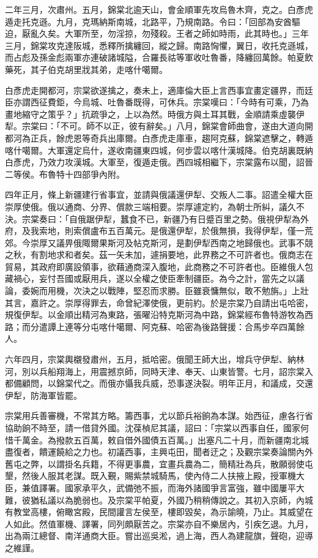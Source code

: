 \begin{pinyinscope}
二年三月，次肅州。五月，錦棠北逾天山，會金順軍先攻烏魯木齊，克之。白彥虎遁走托克遜。九月，克瑪納斯南城，北路平，乃規南路。令曰：「回部為安酋驅迫，厭亂久矣。大軍所至，勿淫掠，勿殘殺。王者之師如時雨，此其時也。」三年三月，錦棠攻克達阪城，悉釋所擒纏回，縱之歸。南路恟懼，翼日，收托克遜城，而占彪及孫金彪兩軍亦連破諸城隘，合羅長祜等軍收吐魯番，降纏回萬餘。帕夏飲藥死，其子伯克胡里戕其弟，走喀什噶爾。

白彥虎走開都河，宗棠欲遂擒之，奏未上，適庫倫大臣上言西事宜畫定疆界，而廷臣亦謂西征費鉅，今烏城、吐魯番既得，可休兵。宗棠嘆曰：「今時有可乘，乃為畫地縮守之策乎？」抗疏爭之，上以為然。時俄方與土耳其戰，金順請乘虛襲伊犁。宗棠曰：「不可。師不以正，彼有辭矣。」八月，錦棠會師曲會，遂由大道向開都河為正兵，餘虎恩等奇兵出庫爾。白彥虎走庫車，趨阿克蘇，錦棠遮擊之，轉遁喀什噶爾。大軍還定烏什，遂收南疆東四城，何步雲以喀什漢城降。伯克胡裏既納白彥虎，乃效力攻漢城。大軍至，復遁走俄。西四城相繼下，宗棠露布以聞，詔晉二等侯。布魯特十四部爭內附。

四年正月，條上新疆建行省事宜，並請與俄議還伊犁、交叛人二事。詔遣全權大臣崇厚使俄。俄以通商、分界、償款三端相要。崇厚遽定約，為朝士所糾，議久不決。宗棠奏曰：「自俄踞伊犁，蠶食不已，新疆乃有日蹙百里之勢。俄視伊犁為外府，及我索地，則索償盧布五百萬元。是俄還伊犁，於俄無損，我得伊犁，僅一荒郊。今崇厚又議畀俄陬爾果斯河及帖克斯河，是劃伊犁西南之地歸俄也。武事不競之秋，有割地求和者矣。茲一矢未加，遽捐要地，此界務之不可許者也。俄商志在貿易，其政府即廣設領事，欲藉通商深入腹地，此商務之不可許者也。臣維俄人包藏禍心，妄忖吾國或厭用兵，遂以全權之使臣牽制疆臣。為今之計，當先之以議論，委婉而用機，次決之以戰陣，堅忍而求勝。臣雖衰慵無似，敢不勉旃。」上壯其言，嘉許之。崇厚得罪去，命曾紀澤使俄，更前約。於是宗棠乃自請出屯哈密，規復伊犁。以金順出精河為東路，張曜沿特克斯河為中路，錦棠經布魯特游牧為西路；而分遣譚上連等分屯喀什噶爾、阿克蘇、哈密為後路聲援：合馬步卒四萬餘人。

六年四月，宗棠輿櫬發肅州，五月，抵哈密。俄聞王師大出，增兵守伊犁、納林河，別以兵船翔海上，用震撼京師，同時天津、奉天、山東皆警。七月，詔宗棠入都備顧問，以錦棠代之。而俄亦懾我兵威，恐事遂決裂。明年正月，和議成，交還伊犁，防海軍皆罷。

宗棠用兵善審機，不常其方略。籌西事，尤以節兵裕餉為本謀。始西征，慮各行省協助餉不時至，請一借貸外國。沈葆楨尼其議，詔曰：「宗棠以西事自任，國家何惜千萬金。為撥款五百萬，敕自借外國債五百萬。」出塞凡二十月，而新疆南北城盡復者，饋運饒給之力也。初議西事，主興屯田，聞者迂之；及觀宗棠奏論關內外舊屯之弊，以謂掛名兵籍，不得更事農，宜畫兵農為二，簡精壯為兵，散願弱使屯墾，然後人服其老謀。既入覲，賜紫禁城騎馬，使內侍二人扶掖上殿，授軍機大臣，兼值譯署。國家承平久，武備弛不振，而海外諸國爭言富強，雖中國屢平大難，彼猶私議以為脆弱也。及宗棠平帕夏，外國乃稍稍傳說之。其初入京師，內城有教堂高樓，俯瞰宮殿，民間讙言左侯至，樓即毀矣，為示諭曉，乃止。其威望在人如此。然值軍機、譯署，同列頗厭苦之。宗棠亦自不樂居內，引疾乞退。九月，出為兩江總督、南洋通商大臣。嘗出巡吳淞，過上海，西人為建龍旗，聲砲，迎導之維謹。


\end{pinyinscope}
